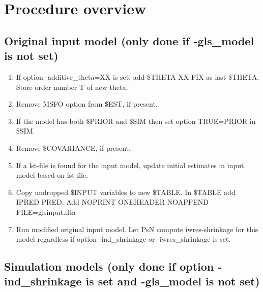 \section{Procedure overview}

\subsection{Original input model (only done if -gls\_model is not set)}

\begin{enumerate}
\item If option -additive\_theta=XX is set, add \$THETA XX FIX as last \$THETA. Store order number T of new theta.
\item Remove MSFO option from \$EST, if present.
\item If the model has both \$PRIOR and \$SIM then set option TRUE=PRIOR in \$SIM. 
\item Remove \$COVARIANCE, if present.
\item If a lst-file is found for the input model, update initial estimates in input model based on lst-file.
\item Copy undropped \$INPUT variables to new \$TABLE. In \$TABLE add IPRED PRED. Add NOPRINT ONEHEADER NOAPPEND FILE=glsinput.dta
\item Run modified original input model. Let PsN compute iwres-shrinkage for this model regardless if option -ind\_shrinkage or -iwres\_shrinkage is set.
\end{enumerate}

\subsection{Simulation models (only done if option -ind\_shrinkage is set and -gls\_model is not set)}

